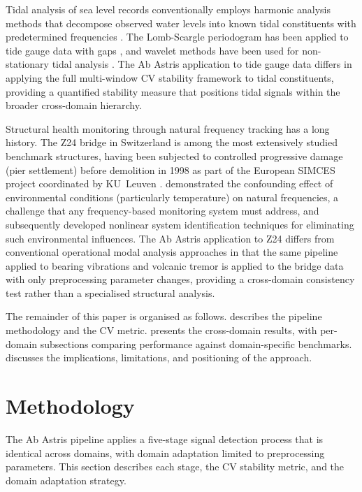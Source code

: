 \documentclass[11pt,a4paper]{article}
\begin{document}
Tidal analysis of sea level records conventionally employs harmonic analysis methods that decompose observed water levels into known tidal constituents with predetermined frequencies \citep{Foreman1977}. The Lomb-Scargle periodogram has been applied to tide gauge data with gaps \citep{Erol2011}, and wavelet methods have been used for non-stationary tidal analysis \citep{Flinchem2000}. The Ab Astris application to tide gauge data differs in applying the full multi-window CV stability framework to tidal constituents, providing a quantified stability measure that positions tidal signals within the broader cross-domain hierarchy.

Structural health monitoring through natural frequency tracking has a long history. The Z24 bridge in Switzerland is among the most extensively studied benchmark structures, having been subjected to controlled progressive damage (pier settlement) before demolition in 1998 as part of the European SIMCES project coordinated by KU~Leuven \citep{DeRoeck2003,Maeck2003,Reynders2015}. \citet{Peeters2001} demonstrated the confounding effect of environmental conditions (particularly temperature) on natural frequencies, a challenge that any frequency-based monitoring system must address, and \citet{Reynders2014} subsequently developed nonlinear system identification techniques for eliminating such environmental influences. The Ab Astris application to Z24 differs from conventional operational modal analysis approaches in that the same pipeline applied to bearing vibrations and volcanic tremor is applied to the bridge data with only preprocessing parameter changes, providing a cross-domain consistency test rather than a specialised structural analysis.

The remainder of this paper is organised as follows.  describes the pipeline methodology and the CV metric.  presents the cross-domain results, with per-domain subsections comparing performance against domain-specific benchmarks.  discusses the implications, limitations, and positioning of the approach.


\section{Methodology}
\label{sec:methodology}

The Ab Astris pipeline applies a five-stage signal detection process that is identical across domains, with domain adaptation limited to preprocessing parameters. This section describes each stage, the CV stability metric, and the domain adaptation strategy.
\end{document}
